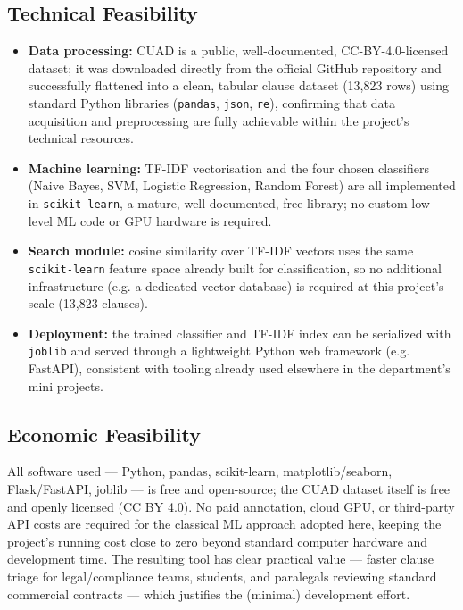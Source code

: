\documentclass[12pt, a4paper]{report}
\begin{document}
\subsection{Technical Feasibility}
\begin{itemize}
    \item \textbf{Data processing:} CUAD is a public, well-documented, CC-BY-4.0-licensed dataset; it was downloaded directly from the official GitHub repository and successfully flattened into a clean, tabular clause dataset (13,823 rows) using standard Python libraries (\texttt{pandas}, \texttt{json}, \texttt{re}), confirming that data acquisition and preprocessing are fully achievable within the project's technical resources.
    \item \textbf{Machine learning:} TF-IDF vectorisation and the four chosen classifiers (Naive Bayes, SVM, Logistic Regression, Random Forest) are all implemented in \texttt{scikit-learn}, a mature, well-documented, free library; no custom low-level ML code or GPU hardware is required.
    \item \textbf{Search module:} cosine similarity over TF-IDF vectors uses the same \texttt{scikit-learn} feature space already built for classification, so no additional infrastructure (e.g. a dedicated vector database) is required at this project's scale (13,823 clauses).
    \item \textbf{Deployment:} the trained classifier and TF-IDF index can be serialized with \texttt{joblib} and served through a lightweight Python web framework (e.g. FastAPI), consistent with tooling already used elsewhere in the department's mini projects.
\end{itemize}

\subsection{Economic Feasibility}
All software used — Python, pandas, scikit-learn, matplotlib/seaborn, Flask/FastAPI, joblib — is free and open-source; the CUAD dataset itself is free and openly licensed (CC BY 4.0).
No paid annotation, cloud GPU, or third-party API costs are required for the classical ML approach adopted here, keeping the project's running cost close to zero beyond standard computer hardware and development time.
The resulting tool has clear practical value — faster clause triage for legal/compliance teams, students, and paralegals reviewing standard commercial contracts — which justifies the (minimal) development effort.
\end{document}
